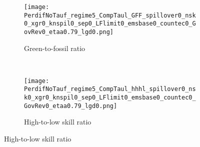 \begin{figure}[h!!]
\begin{subfigure}[]{0.4\textwidth}
\caption{{ Green-to-fossil ratio }}
\texttt{[image: PerdifNoTauf\_regime5\_CompTaul\_GFF\_spillover0\_nsk0\_xgr0\_knspil0\_sep0\_LFlimit0\_emsbase0\_countec0\_GovRev0\_etaa0.79\_lgd0.png]}
\end{subfigure}
\begin{minipage}[]{0.1\textwidth}
	\
\end{minipage}
\begin{subfigure}[]{0.4\textwidth}
\caption{{ High-to-low skill ratio }}
\texttt{[image: PerdifNoTauf\_regime5\_CompTaul\_hhhl\_spillover0\_nsk0\_xgr0\_knspil0\_sep0\_LFlimit0\_emsbase0\_countec0\_GovRev0\_etaa0.79\_lgd0.png]}
\end{subfigure}
\end{figure}


